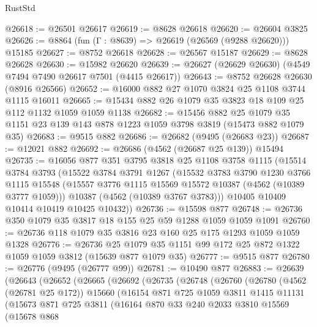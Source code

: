 \begin{lexlean}{RustStd}
\begin{coremodule}
@26618 := @26501 @26617
@26619 := @8628 @26618
@26620 := @26604 @3825
@26626 := @8864 (fun (Γ : @8639) => @26619 (@26569 (@9288 @26620))) @15185
@26627 := @8752 @26618
@26628 := @26567 @15187
@26629 := @8628 @26628
@26630 := @15982 @26620
@26639 := @26627 (@26629 @26630) (@4549 @7494 @7490 @26617 @7501 (@4415 @26617))
@26643 := @8752 @26628 @26630 (@8916 @26566)
@26652 := @16000 @882 @27 @1070 @3824 @25 @1108 @3744 @1115 @16011
@26665 := @15434 @882 @26 @1079 @35 @3823 @18 @109 @25 @112 @1132 @1059 @1059 @1138
@26682 := @15456
    @882
    @25
    @1079
    @35
    @1151
    @23
    @139
    @143
    @878
    @1223
    @1059
    @3798
    @3819
    (@15473 @882 @1079 @35)
@26683 := @9515 @882
@26686 := @26682 (@9495 (@26683 @23))
@26687 := @12021 @882
@26692 := @26686 (@4562 (@26687 @25 @139)) @15494
@26735 := @16056
    @877
    @351
    @3795
    @3818
    @25
    @1108
    @3758
    @1115
    (@15514
      @3784
      @3793
      (@15522
        @3784
        @3791
        @1267
        (@15532
          @3783
          @3790
          @1230
          @3766
          @1115
          @15548
          (@15557 @3776 @1115 @15569 @15572 @10387 (@4562 (@10389 @3777 @1059)))
          @10387
          (@4562 (@10389 @3767 @3783)))
        @10405
        @10409
        @10414
        @10419
        @10425
        @10432))
@26736 := @15598 @877
@26748 := @26736 @350 @1079 @35 @3817 @18 @155 @25 @59 @1288 @1059 @1059 @1091
@26760 := @26736 @118 @1079 @35 @3816 @23 @160 @25 @175 @1293 @1059 @1059 @1328
@26776 := @26736
    @25
    @1079
    @35
    @1151
    @99
    @172
    @25
    @872
    @1322
    @1059
    @1059
    @3812
    (@15639 @877 @1079 @35)
@26777 := @9515 @877
@26780 := @26776 (@9495 (@26777 @99))
@26781 := @10490 @877
@26883 := @26639
    (@26643
      (@26652
        (@26665
          (@26692
            (@26735
              (@26748
                (@26760
                  (@26780
                    (@4562 (@26781 @25 @172))
                    @15660
                    (@16154
                      @871
                      @725
                      @1059
                      @3811
                      @1415
                      @11131
                      (@15673
                        @871
                        @725
                        @3811
                        (@16164
                          @870
                          @33
                          @240
                          @2033
                          @3810
                          @15569
                          (@15678
                            @868

\end{coremodule}
\end{lexlean}
